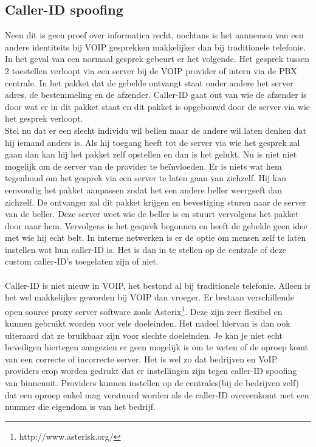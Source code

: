 \documentclass[pdftex,a4paper,12pt,twoside]{report}
\begin{document}
\subsection{Caller-ID spoofing}
Neen dit is geen proef over informatica recht, nochtans is het aannemen van een andere identiteits bij VOIP gesprekken makkelijker dan bij traditionele telefonie. In het geval van een normaal gesprek gebeurt er het volgende. Het gesprek tussen 2 toestellen verloopt via een server bij de VOIP provider of intern via de PBX centrale. In het pakket dat de gebelde ontvangt staat onder andere het server adres, de bestemmeling en de afzender. Caller-ID gaat out van wie de afzender is door wat er in dit pakket staat en dit pakket is opgebouwd door de server via wie het gesprek verloopt.\\
Stel nu dat er een slecht individu wil bellen maar de andere wil laten denken dat hij iemand anders is. Als hij toegang heeft tot de server via wie het gesprek zal gaan dan kan hij het pakket zelf opstellen en dan is het gelukt. Nu is niet niet mogelijk om de server van de provider te beïnvloeden. Er is niets wat hem tegenhoud om het gesprek via een server te laten gaan van zichzelf. Hij kan eenvoudig het pakket aanpassen zodat het een andere beller weergeeft dan zichzelf. De ontvanger zal dit pakket krijgen en bevestiging sturen naar de server van de beller. Deze server weet wie de beller is en stuurt vervolgens het pakket door naar hem. Vervolgens is het gesprek begonnen en heeft de gebelde geen idee met wie hij echt belt. In interne netwerken is er de optie om mensen zelf te laten instellen wat hun caller-ID is. Het is dan in te stellen op de centrale of deze custom caller-ID's toegelaten zijn of niet.
\\ \\
Caller-ID is niet nieuw in VOIP, het bestond al bij traditionele telefonie. Alleen is het wel makkelijker geworden bij VOIP dan vroeger. Er bestaan verschillende open source proxy server software zoals Asterix\footnote{http://www.asterisk.org/}. Deze zijn zeer flexibel en kunnen gebruikt worden voor vele doeleinden. Het nadeel hiervan is dan ook uiteraard dat ze bruikbaar zijn voor slechte doeleinden. 
\newpage
Je kan je niet echt beveiligen hiertegen aangezien er geen mogelijk is om te weten of de oproep komt van een correcte of incorrecte server. Het is wel zo dat bedrijven en VoIP providers erop worden gedrukt dat er instellingen zijn tegen caller-ID spoofing van binnenuit. Providers kunnen instellen op de centrales(bij de bedrijven zelf) dat een oproep enkel mag verstuurd worden als de caller-ID overeenkomt met een nummer die eigendom is van het bedrijf.
\end{document}
